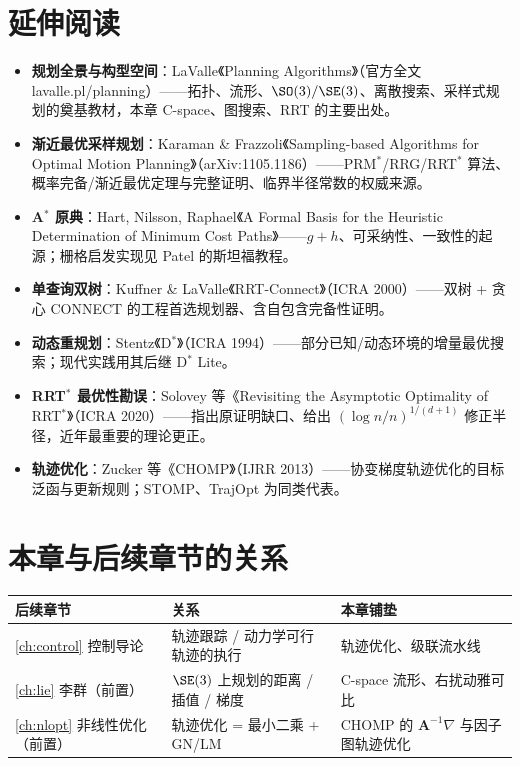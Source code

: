 \section*{延伸阅读}
\begin{itemize}
  \item \textbf{规划全景与构型空间}：LaValle《Planning Algorithms》\cite{lavalle2006planning}（官方全文 lavalle.pl/planning）——拓扑、流形、$\SO(3)/\SE(3)$、离散搜索、采样式规划的奠基教材，本章 C-space、图搜索、RRT 的主要出处。
  \item \textbf{渐近最优采样规划}：Karaman \& Frazzoli《Sampling-based Algorithms for Optimal Motion Planning》\cite{karaman2011sampling}（arXiv:1105.1186）——PRM$^*$/RRG/RRT$^*$ 算法、概率完备/渐近最优定理与完整证明、临界半径常数的权威来源。
  \item \textbf{A$^*$ 原典}：Hart, Nilsson, Raphael《A Formal Basis for the Heuristic Determination of Minimum Cost Paths》\cite{hart1968astar}——$g+h$、可采纳性、一致性的起源；栅格启发实现见 Patel 的斯坦福教程\cite{patel2018heuristics}。
  \item \textbf{单查询双树}：Kuffner \& LaValle《RRT-Connect》\cite{kuffner2000rrtconnect}（ICRA 2000）——双树 + 贪心 CONNECT 的工程首选规划器、含自包含完备性证明。
  \item \textbf{动态重规划}：Stentz《D$^*$》\cite{stentz1994optimal}（ICRA 1994）——部分已知/动态环境的增量最优搜索；现代实践用其后继 D$^*$ Lite。
  \item \textbf{RRT$^*$ 最优性勘误}：Solovey 等《Revisiting the Asymptotic Optimality of RRT$^*$》\cite{solovey2020revisiting}（ICRA 2020）——指出原证明缺口、给出 $(\log n/n)^{1/(d+1)}$ 修正半径，近年最重要的理论更正。
  \item \textbf{轨迹优化}：Zucker 等《CHOMP》\cite{zucker2013chomp}（IJRR 2013）——协变梯度轨迹优化的目标泛函与更新规则；STOMP、TrajOpt 为同类代表。
\end{itemize}

\section*{本章与后续章节的关系}
\begin{table}[H]\centering\small
\begin{tabular}{lll}
\toprule
后续章节 & 关系 & 本章铺垫 \\
\midrule
\cref{ch:control} 控制导论 & 轨迹跟踪 / 动力学可行轨迹的执行 & 轨迹优化、级联流水线 \\
\cref{ch:lie} 李群（前置） & $\SE(3)$ 上规划的距离 / 插值 / 梯度 & C-space 流形、右扰动雅可比 \\
\cref{ch:nlopt} 非线性优化（前置） & 轨迹优化 = 最小二乘 + GN/LM & CHOMP 的 $\mathbf{A}^{-1}\nabla$ 与因子图轨迹优化 \\
\bottomrule
\end{tabular}
\end{table}


